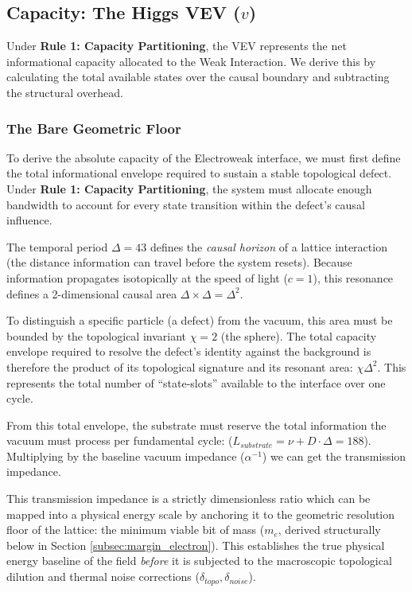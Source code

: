 \subsection{Capacity: The Higgs VEV (\texorpdfstring{$v$}{v})}
Under \textbf{Rule 1: Capacity Partitioning}, the VEV represents the net informational capacity allocated to the Weak Interaction. We derive this by calculating the total available states over the causal boundary and subtracting the structural overhead.

\subsubsection{The Bare Geometric Floor}
To derive the absolute capacity of the Electroweak interface, we must first define the total informational envelope required to sustain a stable topological defect. Under \textbf{Rule 1: Capacity Partitioning}, the system must allocate enough bandwidth to account for every state transition within the defect's causal influence.

The temporal period $\Delta=43$ defines the \textit{causal horizon} of a lattice interaction (the distance information can travel before the system resets). Because information propagates isotopically at the speed of light ($c=1$), this resonance defines a 2-dimensional causal area $\Delta \times \Delta = \Delta^2$. 

To distinguish a specific particle (a defect) from the vacuum, this area must be bounded by the topological invariant $\chi=2$ (the sphere). The total capacity envelope required to resolve the defect's identity against the background is therefore the product of its topological signature and its resonant area: $\chi \Delta^2$. This represents the total number of ``state-slots'' available to the interface over one cycle. 

From this total envelope, the substrate must reserve the total information the vacuum must process per fundamental cycle: ($L_{substrate} = \nu + D \cdot \Delta = 188$\cite{meyer_ieaction_2026}). Multiplying by the baseline vacuum impedance ($\alpha^{-1}$) we can get the transmission impedance.

This transmission impedance is a strictly dimensionless ratio which can be mapped into a physical energy scale by anchoring it to the geometric resolution floor of the lattice: the minimum viable bit of mass ($m_e$, derived structurally below in Section \ref{subsec:margin_electron}). This establishes the true physical energy baseline of the field \textit{before} it is subjected to the macroscopic topological dilution and thermal noise corrections ($\delta_{topo}, \delta_{noise}$).

